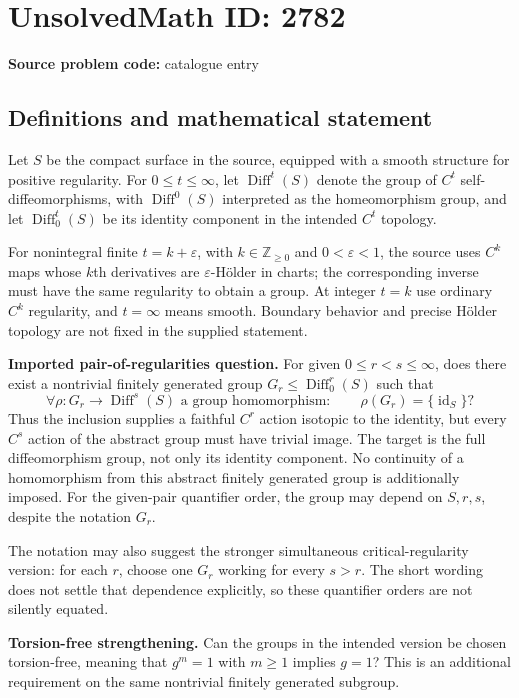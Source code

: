 \documentclass[11pt]{article}
\newcommand{\Z}{\mathbb{Z}}
\begin{document}
\section*{UnsolvedMath ID: 2782}
\textbf{Source problem code:} catalogue entry
\subsection{Definitions and mathematical statement}
Let $S$ be the compact surface in the source, equipped with a smooth structure for positive regularity. For $0\leq t\leq\infty$, let $\operatorname{Diff}^t(S)$ denote the group of $C^t$ self-diffeomorphisms, with $\operatorname{Diff}^0(S)$ interpreted as the homeomorphism group, and let $\operatorname{Diff}^t_0(S)$ be its identity component in the intended $C^t$ topology.

For nonintegral finite $t=k+\varepsilon$, with $k\in\Z_{\geq0}$ and $0<\varepsilon<1$, the source uses $C^k$ maps whose $k$th derivatives are $\varepsilon$-Hölder in charts; the corresponding inverse must have the same regularity to obtain a group. At integer $t=k$ use ordinary $C^k$ regularity, and $t=\infty$ means smooth. Boundary behavior and precise Hölder topology are not fixed in the supplied statement.

\textbf{Imported pair-of-regularities question.} For given $0\leq r<s\leq\infty$, does there exist a nontrivial finitely generated group $G_r\leq\operatorname{Diff}^r_0(S)$ such that
\[
 \forall\rho:G_r\longrightarrow\operatorname{Diff}^{s}(S)
 \text{ a group homomorphism}:\qquad \rho(G_r)=\{\operatorname{id}_S\}?
\]
Thus the inclusion supplies a faithful $C^r$ action isotopic to the identity, but every $C^s$ action of the abstract group must have trivial image. The target is the full diffeomorphism group, not only its identity component. No continuity of a homomorphism from this abstract finitely generated group is additionally imposed. For the given-pair quantifier order, the group may depend on $S,r,s$, despite the notation $G_r$.

The notation may also suggest the stronger simultaneous critical-regularity version: for each $r$, choose one $G_r$ working for every $s>r$. The short wording does not settle that dependence explicitly, so these quantifier orders are not silently equated.

\textbf{Torsion-free strengthening.} Can the groups in the intended version be chosen torsion-free, meaning that $g^m=1$ with $m\geq1$ implies $g=1$? This is an additional requirement on the same nontrivial finitely generated subgroup.
\end{document}
